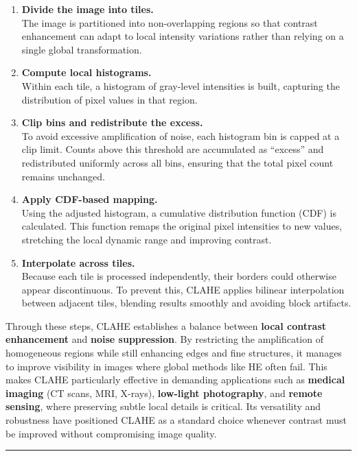 \documentclass[11pt]{article}
\begin{document}
\begin{enumerate}
\def\labelenumi{\arabic{enumi}.}
\item
  \textbf{Divide the image into tiles.}\\
  The image is partitioned into non-overlapping regions so that contrast
  enhancement can adapt to local intensity variations rather than
  relying on a single global transformation.
\item
  \textbf{Compute local histograms.}\\
  Within each tile, a histogram of gray-level intensities is built,
  capturing the distribution of pixel values in that region.
\item
  \textbf{Clip bins and redistribute the excess.}\\
  To avoid excessive amplification of noise, each histogram bin is
  capped at a clip limit. Counts above this threshold are accumulated as
  ``excess'' and redistributed uniformly across all bins, ensuring that
  the total pixel count remains unchanged.
\item
  \textbf{Apply CDF-based mapping.}\\
  Using the adjusted histogram, a cumulative distribution function (CDF)
  is calculated. This function remaps the original pixel intensities to
  new values, stretching the local dynamic range and improving contrast.
\item
  \textbf{Interpolate across tiles.}\\
  Because each tile is processed independently, their borders could
  otherwise appear discontinuous. To prevent this, CLAHE applies
  bilinear interpolation between adjacent tiles, blending results
  smoothly and avoiding block artifacts.
\end{enumerate}

Through these steps, CLAHE establishes a balance between \textbf{local
contrast enhancement} and \textbf{noise suppression}. By restricting the
amplification of homogeneous regions while still enhancing edges and
fine structures, it manages to improve visibility in images where global
methods like HE often fail. This makes CLAHE particularly effective in
demanding applications such as \textbf{medical imaging} (CT scans, MRI,
X-rays), \textbf{low-light photography}, and \textbf{remote sensing},
where preserving subtle local details is critical. Its versatility and
robustness have positioned CLAHE as a standard choice whenever contrast
must be improved without compromising image quality.

\begin{center}\rule{0.5\linewidth}{0.5pt}\end{center}
\end{document}
